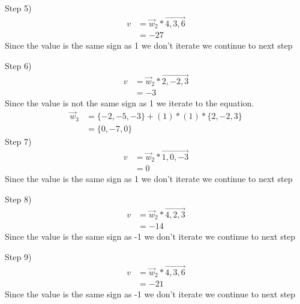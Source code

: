 \documentclass[12pt,english]{article}
\begin{document}
Step 5)
\begin{equation*}
\begin{split}
v&= \vec{w}_2 * \overrightarrow{4,3,6}\\
&= -27
\end{split}
\end{equation*}
Since the value is the same sign as 1 we don't iterate we continue to next step\par

Step 6)
\begin{equation*}
\begin{split}
v&= \vec{w}_2* \overrightarrow{2,-2,3}\\
&= -3
\end{split}
\end{equation*}
Since the value is not the same sign as 1 we iterate to the equation.
\begin{equation}\tag{2}
\begin{split}
\vec{w}_{3} &= \{-2,-5,-3\}+ (1) * (1) * \{2,-2,3 \}\\
&= \{0,-7,0 \}
\end{split}
\end{equation}
Step 7)
\begin{equation*}
\begin{split}
v&= \vec{w}_2* \overrightarrow{1,0,-3}\\
&= 0
\end{split}
\end{equation*}
Since the value is the same sign as 1 we don't iterate we continue to next step\par

Step 8)
\begin{equation*}
\begin{split}
v&= \vec{w}_2* \overrightarrow{4,2,3}\\
&= -14
\end{split}
\end{equation*}
Since the value is the same sign as -1 we don't iterate we continue to next step\par

Step 9)
\begin{equation*}
\begin{split}
v&= \vec{w}_2* \overrightarrow{4,3,6}\\
&= -21
\end{split}
\end{equation*}
Since the value is the same sign as -1 we don't iterate we continue to next step\par
\end{document}
